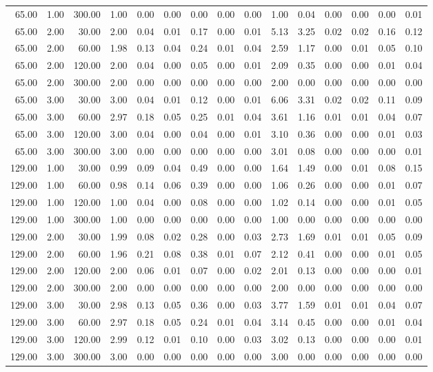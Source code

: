 \begin{table}[ht]
\begin{tabular}{rrrrrrrrrrrrrrr}
  65.00 & 1.00 & 300.00 & 1.00 & 0.00 & 0.00 & 0.00 & 0.00 & 0.00 & 1.00 & 0.04 & 0.00 & 0.00 & 0.00 & 0.01 \\ 
  65.00 & 2.00 & 30.00 & 2.00 & 0.04 & 0.01 & 0.17 & 0.00 & 0.01 & 5.13 & 3.25 & 0.02 & 0.02 & 0.16 & 0.12 \\ 
  65.00 & 2.00 & 60.00 & 1.98 & 0.13 & 0.04 & 0.24 & 0.01 & 0.04 & 2.59 & 1.17 & 0.00 & 0.01 & 0.05 & 0.10 \\ 
  65.00 & 2.00 & 120.00 & 2.00 & 0.04 & 0.00 & 0.05 & 0.00 & 0.01 & 2.09 & 0.35 & 0.00 & 0.00 & 0.01 & 0.04 \\ 
  65.00 & 2.00 & 300.00 & 2.00 & 0.00 & 0.00 & 0.00 & 0.00 & 0.00 & 2.00 & 0.00 & 0.00 & 0.00 & 0.00 & 0.00 \\ 
  65.00 & 3.00 & 30.00 & 3.00 & 0.04 & 0.01 & 0.12 & 0.00 & 0.01 & 6.06 & 3.31 & 0.02 & 0.02 & 0.11 & 0.09 \\ 
  65.00 & 3.00 & 60.00 & 2.97 & 0.18 & 0.05 & 0.25 & 0.01 & 0.04 & 3.61 & 1.16 & 0.01 & 0.01 & 0.04 & 0.07 \\ 
  65.00 & 3.00 & 120.00 & 3.00 & 0.04 & 0.00 & 0.04 & 0.00 & 0.01 & 3.10 & 0.36 & 0.00 & 0.00 & 0.01 & 0.03 \\ 
  65.00 & 3.00 & 300.00 & 3.00 & 0.00 & 0.00 & 0.00 & 0.00 & 0.00 & 3.01 & 0.08 & 0.00 & 0.00 & 0.00 & 0.01 \\ 
  129.00 & 1.00 & 30.00 & 0.99 & 0.09 & 0.04 & 0.49 & 0.00 & 0.00 & 1.64 & 1.49 & 0.00 & 0.01 & 0.08 & 0.15 \\ 
  129.00 & 1.00 & 60.00 & 0.98 & 0.14 & 0.06 & 0.39 & 0.00 & 0.00 & 1.06 & 0.26 & 0.00 & 0.00 & 0.01 & 0.07 \\ 
  129.00 & 1.00 & 120.00 & 1.00 & 0.04 & 0.00 & 0.08 & 0.00 & 0.00 & 1.02 & 0.14 & 0.00 & 0.00 & 0.01 & 0.05 \\ 
  129.00 & 1.00 & 300.00 & 1.00 & 0.00 & 0.00 & 0.00 & 0.00 & 0.00 & 1.00 & 0.00 & 0.00 & 0.00 & 0.00 & 0.00 \\ 
  129.00 & 2.00 & 30.00 & 1.99 & 0.08 & 0.02 & 0.28 & 0.00 & 0.03 & 2.73 & 1.69 & 0.01 & 0.01 & 0.05 & 0.09 \\ 
  129.00 & 2.00 & 60.00 & 1.96 & 0.21 & 0.08 & 0.38 & 0.01 & 0.07 & 2.12 & 0.41 & 0.00 & 0.00 & 0.01 & 0.05 \\ 
  129.00 & 2.00 & 120.00 & 2.00 & 0.06 & 0.01 & 0.07 & 0.00 & 0.02 & 2.01 & 0.13 & 0.00 & 0.00 & 0.00 & 0.01 \\ 
  129.00 & 2.00 & 300.00 & 2.00 & 0.00 & 0.00 & 0.00 & 0.00 & 0.00 & 2.00 & 0.00 & 0.00 & 0.00 & 0.00 & 0.00 \\ 
  129.00 & 3.00 & 30.00 & 2.98 & 0.13 & 0.05 & 0.36 & 0.00 & 0.03 & 3.77 & 1.59 & 0.01 & 0.01 & 0.04 & 0.07 \\ 
  129.00 & 3.00 & 60.00 & 2.97 & 0.18 & 0.05 & 0.24 & 0.01 & 0.04 & 3.14 & 0.45 & 0.00 & 0.00 & 0.01 & 0.04 \\ 
  129.00 & 3.00 & 120.00 & 2.99 & 0.12 & 0.01 & 0.10 & 0.00 & 0.03 & 3.02 & 0.13 & 0.00 & 0.00 & 0.00 & 0.01 \\ 
  129.00 & 3.00 & 300.00 & 3.00 & 0.00 & 0.00 & 0.00 & 0.00 & 0.00 & 3.00 & 0.00 & 0.00 & 0.00 & 0.00 & 0.00 \\ 
   \hline
\end{tabular}
\end{table}

